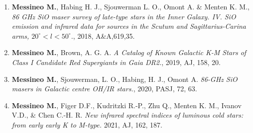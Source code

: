 \documentclass[final,11pt,onecolumn,a4paper,twoside]{scrbook_gj}
\begin{document}
\begin{enumerate}
\item    {\bf Messineo M.}, Habing H. J., Sjouwerman L. O., Omont A. \&
    Menten K. M., {\it 86 GHz SiO maser survey of late-type stars in the Inner Galaxy. IV.
    SiO emission and infrared data for sources 
    in the Scutum and Sagittarius-Carina arms, $20^\circ < l < 50^\circ$.}, 2018, A\&A,619,35.

\item {\bf Messineo M.}, Brown, A. G. A.
{\it A Catalog of Known Galactic K-M Stars of Class I Candidate Red Supergiants in Gaia DR2.},
2019, AJ, 158, 20.

\item {\bf Messineo M.}, Sjouwerman, L. O., Habing, H. J., Omont A.
{\it 86-GHz SiO masers in Galactic centre OH/IR stars.}, 
2020, PASJ, 72, 63.



\item  {\bf Messineo M.}, Figer D.F., Kudritzki R.-P., Zhu Q., Menten K. M.,
Ivanov V.D., \& Chen C.-H. R.
{\it New infrared spectral indices of luminous cold stars: 
from early early K to M-type.} 2021, AJ, 162, 187.

\end{enumerate}
\end{document}
